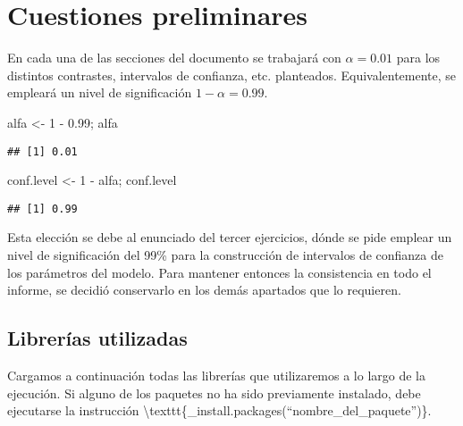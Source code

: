 \documentclass[
]{article}
\newenvironment{Shaded}{\begin{snugshade}}{\end{snugshade}}
\newcommand{\DecValTok}[1]{\textcolor[rgb]{0.00,0.00,0.81}{#1}}
\newcommand{\FloatTok}[1]{\textcolor[rgb]{0.00,0.00,0.81}{#1}}
\newcommand{\NormalTok}[1]{#1}
\newcommand{\OtherTok}[1]{\textcolor[rgb]{0.56,0.35,0.01}{#1}}
\newcommand{\SpecialCharTok}[1]{\textcolor[rgb]{0.00,0.00,0.00}{#1}}
\begin{document}
\hypertarget{cuestiones-preliminares}{%
\section{Cuestiones preliminares}\label{cuestiones-preliminares}}

En cada una de las secciones del documento se trabajará con
\textbf{$\alpha = 0.01$} para los distintos contrastes, intervalos de
confianza, etc. planteados. Equivalentemente, se empleará un nivel de
significación \(1 - \alpha = 0.99\).

\begin{Shaded}
\begin{Highlighting}[]
\NormalTok{alfa }\OtherTok{\textless{}{-}} \DecValTok{1} \SpecialCharTok{{-}} \FloatTok{0.99}\NormalTok{; alfa}
\end{Highlighting}
\end{Shaded}

\begin{verbatim}
## [1] 0.01
\end{verbatim}

\begin{Shaded}
\begin{Highlighting}[]
\NormalTok{conf.level }\OtherTok{\textless{}{-}} \DecValTok{1} \SpecialCharTok{{-}}\NormalTok{ alfa; conf.level}
\end{Highlighting}
\end{Shaded}

\begin{verbatim}
## [1] 0.99
\end{verbatim}

Esta elección se debe al enunciado del tercer ejercicios, dónde se pide
emplear un nivel de significación del 99\% para la construcción de
intervalos de confianza de los parámetros del modelo. Para mantener
entonces la consistencia en todo el informe, se decidió conservarlo en
los demás apartados que lo requieren.

\hypertarget{libreruxedas-utilizadas}{%
\subsection{Librerías utilizadas}\label{libreruxedas-utilizadas}}

Cargamos a continuación todas las librerías que utilizaremos a lo largo
de la ejecución. Si alguno de los paquetes no ha sido previamente
instalado, debe ejecutarse la instrucción
\textbackslash texttt\{\_install.packages(``nombre\_del\_paquete'')\}.
\end{document}
